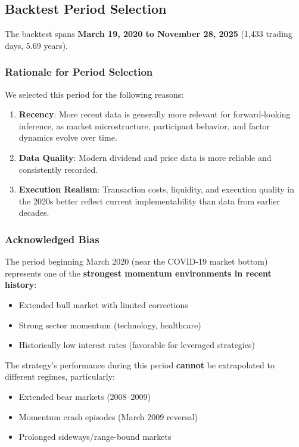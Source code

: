 \documentclass[12pt,a4paper]{article}
\theoremstyle{definition}
\begin{document}
\subsection{Backtest Period Selection}

The backtest spans \textbf{March 19, 2020 to November 28, 2025} (1,433 trading days, 5.69 years).

\subsubsection{Rationale for Period Selection}

We selected this period for the following reasons:

\begin{enumerate}
    \item \textbf{Recency}: More recent data is generally more relevant for forward-looking inference, as market microstructure, participant behavior, and factor dynamics evolve over time.

    \item \textbf{Data Quality}: Modern dividend and price data is more reliable and consistently recorded.

    \item \textbf{Execution Realism}: Transaction costs, liquidity, and execution quality in the 2020s better reflect current implementability than data from earlier decades.
\end{enumerate}

\subsubsection{Acknowledged Bias}

The period beginning March 2020 (near the COVID-19 market bottom) represents one of the \textbf{strongest momentum environments in recent history}:

\begin{itemize}
    \item Extended bull market with limited corrections
    \item Strong sector momentum (technology, healthcare)
    \item Historically low interest rates (favorable for leveraged strategies)
\end{itemize}

The strategy's performance during this period \textbf{cannot} be extrapolated to different regimes, particularly:
\begin{itemize}
    \item Extended bear markets (2008--2009)
    \item Momentum crash episodes (March 2009 reversal)
    \item Prolonged sideways/range-bound markets
\end{itemize}
\end{document}
